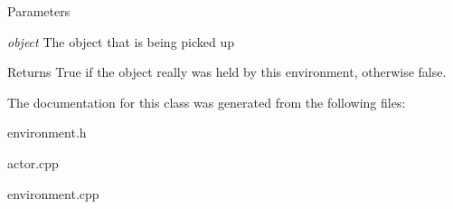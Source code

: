 \begin{DoxyParams}{Parameters}
\item[{\em object}]The object that is being picked up \end{DoxyParams}
\begin{DoxyReturn}{Returns}
True if the object really was held by this environment, otherwise false. 
\end{DoxyReturn}


The documentation for this class was generated from the following files:\begin{DoxyCompactItemize}
\item 
environment.h\item 
actor.cpp\item 
environment.cpp\end{DoxyCompactItemize}
